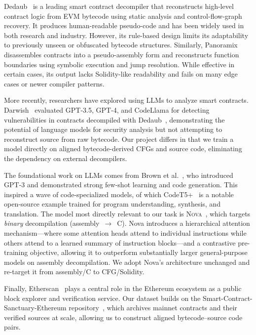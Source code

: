 \documentclass{stylefiles/capstone}
\begin{document}
Dedaub~\cite{neville2023dedaub} is a leading smart contract decompiler that
reconstructs high-level contract logic from EVM bytecode using static analysis and
control-flow-graph recovery. It produces human-readable pseudo-code and has been
widely used in both research and industry. However, its rule-based design limits
its adaptability to previously unseen or obfuscated bytecode structures.
Similarly, Panoramix~\cite{panoramix} disassembles contracts into a
pseudo-assembly form and reconstructs function boundaries using symbolic execution
and jump resolution. While effective in certain cases, its output lacks
Solidity-like readability and fails on many edge cases or newer compiler patterns.

More recently, researchers have explored using LLMs to analyze smart contracts.
Darwish~\cite{darwish2023bytecode} evaluated GPT-3.5, GPT-4, and CodeLlama for
detecting vulnerabilities in contracts decompiled with
Dedaub~\cite{neville2023dedaub}, demonstrating the potential of language models for
security analysis but not attempting to reconstruct source from raw bytecode. Our
project differs in that we train a model directly on aligned bytecode-derived CFGs
and source code, eliminating the dependency on external decompilers.

The foundational work on LLMs comes from Brown et al.~\cite{brown2020language}, who
introduced GPT-3 and demonstrated strong few-shot learning and code generation.
This inspired a wave of code-specialized models, of which
CodeT5+~\cite{wang2023codet5plus} is a notable open-source example trained for
program understanding, synthesis, and translation. The model most directly
relevant to our task is \textsc{Nova}~\cite{jiang2025nova}, which targets
\emph{binary} decompilation (assembly~$\rightarrow$~C). Nova introduces a
hierarchical attention mechanism—where some attention heads attend to individual
instructions while others attend to a learned summary of instruction blocks—and a
contrastive pre-training objective, allowing it to outperform substantially larger
general-purpose models on assembly decompilation. We adopt Nova's architecture
unchanged and re-target it from assembly/C to CFG/Solidity.

Finally, Etherscan~\cite{etherscan} plays a central role in the Ethereum ecosystem
as a public block explorer and verification service. Our dataset builds on the
Smart-Contract-Sanctuary-Ethereum repository~\cite{smart_contract_sanctuary}, which
archives mainnet contracts and their verified sources at scale, allowing us to
construct aligned bytecode--source code pairs.
\end{document}
